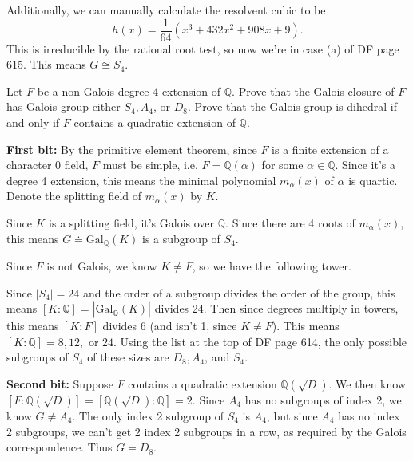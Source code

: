 \documentclass[10pt]{report}
\begin{document}
Additionally, we can manually calculate the resolvent cubic to be
\[
	h(x) = \frac{1}{64} \left( x^3+432x^2+908x+9 \right).
\] This is irreducible by the rational root test, so now we're in case (a) of DF page 615. This means $G \cong S_4$.

\pagebreak
\begin{exer}[14.6: 11]
Let $F$ be a non-Galois degree 4 extension of $\mathbb{Q}$. Prove that the Galois closure of $F$ has Galois group either $S_4,A_4$, or $D_8$. Prove that the Galois group is dihedral if and only if $F$ contains a quadratic extension of $\mathbb{Q}$.
\end{exer}
\textbf{First bit:} By the primitive element theorem, since $F$ is a finite extension of a character 0 field, $F$ must be simple, i.e. $F = \mathbb{Q}(\alpha)$ for some $\alpha \in \mathbb{Q}$. Since it's a degree 4 extension, this means the minimal polynomial $m_{\alpha}(x)$ of $\alpha$ is quartic. Denote the splitting field of $m_{\alpha}(x)$ by $K$.

Since $K$ is a splitting field, it's Galois over $\mathbb{Q}$. Since there are 4 roots of $m_{\alpha}(x)$, this means $G \doteq \text{Gal}_{\mathbb{Q}}(K)$ is a subgroup of $S_{4}$.

Since $F$ is not Galois, we know $K \neq F$, so we have the following tower.
\begin{figure}[H]
	\centering
\end{figure}
Since $\left| S_{4} \right|=24$ and the order of a subgroup divides the order of the group, this means $[K:\mathbb{Q}] = |\text{Gal}_{\mathbb{Q}}(K)| $ divides 24. Then since degrees multiply in towers, this means $[K:F]$ divides $6$ (and isn't 1, since $K \neq F$). This means $[K:\mathbb{Q}]=8, 12, $ or $24$. Using the list at the top of DF page 614, the only possible subgroups of $S_4$ of these sizes are $D_8, A_4$, and $S_4$.

\textbf{Second bit:} Suppose $F$ contains a quadratic extension $\mathbb{Q}(\sqrt{D} )$. We then know $[F:\mathbb{Q}(\sqrt{D} )]=[\mathbb{Q}(\sqrt{D} ):\mathbb{Q}]=2$. Since $A_4$ has no subgroups of index 2, we know $G \neq A_4$. The only index 2 subgroup of $S_4$ is $A_4$, but since $A_4$ has no index 2 subgroups, we can't get 2 index 2 subgroups in a row, as required by the Galois correspondence. Thus $G = D_8$.
\end{document}
